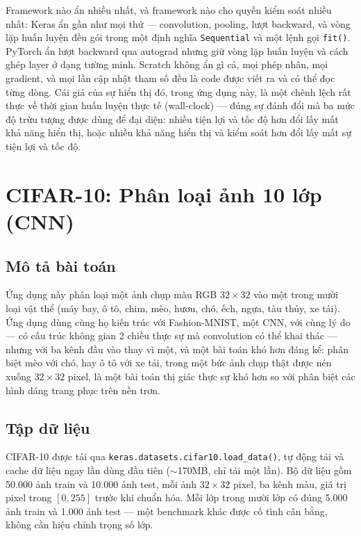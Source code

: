 \documentclass[11pt]{article}
\newcommand{\code}[1]{\texttt{#1}}
\begin{document}
Framework nào ẩn nhiều nhất, và framework nào cho quyền kiểm soát nhiều
nhất: Keras ẩn gần như mọi thứ — convolution, pooling, lượt backward, và
vòng lặp huấn luyện đều gói trong một định nghĩa \code{Sequential} và một
lệnh gọi \code{fit()}. PyTorch ẩn lượt backward qua autograd nhưng giữ
vòng lặp huấn luyện và cách ghép layer ở dạng tường minh. Scratch không ẩn
gì cả, mọi phép nhân, mọi gradient, và mọi lần cập nhật tham số đều là code
được viết ra và có thể đọc từng dòng. Cái giá của sự hiển thị đó, trong
ứng dụng này, là một chênh lệch rất thực về thời gian huấn luyện thực tế
(wall-clock) — đúng sự đánh đổi mà ba mức độ trừu tượng được dùng để đại
diện: nhiều tiện lợi và tốc độ hơn đổi lấy mất khả năng hiển thị, hoặc
nhiều khả năng hiển thị và kiểm soát hơn đổi lấy mất sự tiện lợi và tốc độ.

\newpage
\section{CIFAR-10: Phân loại ảnh 10 lớp (CNN)}
\label{sec:cifar10}

\subsection{Mô tả bài toán}

Ứng dụng này phân loại một ảnh chụp màu RGB $32\times32$ vào một trong
mười loại vật thể (máy bay, ô tô, chim, mèo, hươu, chó, ếch, ngựa, tàu
thủy, xe tải). Ứng dụng dùng cùng họ kiến trúc với Fashion-MNIST, một CNN,
với cùng lý do — có cấu trúc không gian 2 chiều thực sự mà convolution có
thể khai thác — nhưng với ba kênh đầu vào thay vì một, và một bài toán khó
hơn đáng kể: phân biệt mèo với chó, hay ô tô với xe tải, trong một bức
ảnh chụp thật được nén xuống $32\times32$ pixel, là một bài toán thị giác
thực sự khó hơn so với phân biệt các hình dáng trang phục trên nền trơn.

\subsection{Tập dữ liệu}

CIFAR-10 được tải qua \code{keras.datasets.cifar10.load\_data()}, tự động
tải và cache dữ liệu ngay lần dùng đầu tiên ($\sim$170MB, chỉ tải một lần).
Bộ dữ liệu gồm 50.000 ảnh train và 10.000 ảnh test, mỗi ảnh $32\times32$
pixel, ba kênh màu, giá trị pixel trong $[0,255]$ trước khi chuẩn hóa. Mỗi
lớp trong mười lớp có đúng 5.000 ảnh train và 1.000 ảnh test — một
benchmark khác được cố tình cân bằng, không cần hiệu chỉnh trọng số lớp.
\end{document}
